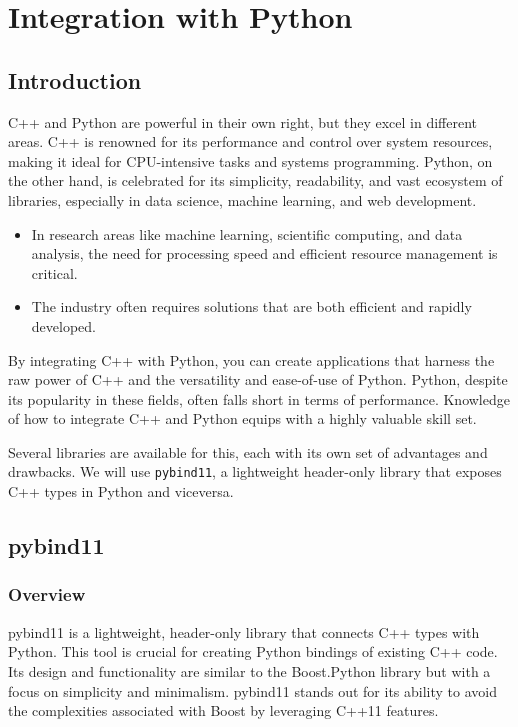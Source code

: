 
\chapter{Integration with Python}

\section{Introduction}

C++ and Python are powerful in their own right, but they excel in different areas. C++ is renowned
for its performance and control over system resources, making it ideal for CPU-intensive tasks and
systems programming. Python, on the other hand, is celebrated for its simplicity, readability, and
vast ecosystem of libraries, especially in data science, machine learning, and web development.
\begin{itemize}
    \item In research areas like machine learning, scientific computing, and data analysis, the need for
    processing speed and efficient resource management is critical.
    \item The industry often requires solutions that are both efficient and rapidly developed.
\end{itemize}
By integrating C++ with Python, you can create applications that harness the raw power of C++
and the versatility and ease-of-use of Python. Python, despite its popularity in these fields, often
falls short in terms of performance. Knowledge of how to integrate C++ and Python equips with a
highly valuable skill set.

Several libraries are available for this, each with its own set of advantages and drawbacks.
We will use \texttt{pybind11}, a lightweight header-only library that exposes C++ types in Python and viceversa.

\section{pybind11}

\subsection{Overview}

pybind11 is a lightweight, header-only library that connects C++ types with Python. This tool is
crucial for creating Python bindings of existing C++ code. Its design and functionality are similar to
the Boost.Python library but with a focus on simplicity and minimalism. pybind11 stands out for its
ability to avoid the complexities associated with Boost by leveraging C++11 features.

